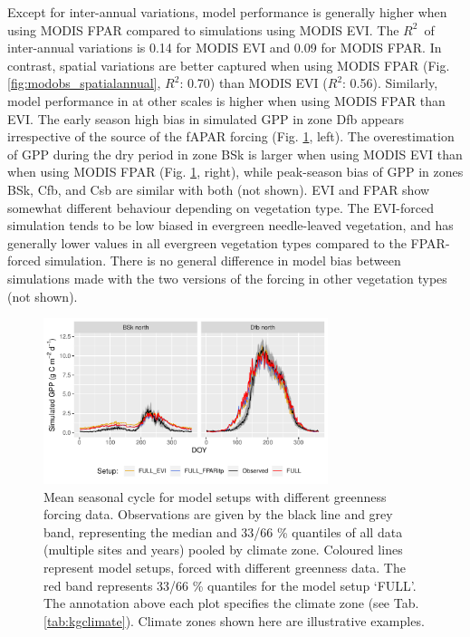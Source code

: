\documentclass[gmd, manuscript]{copernicus}
\newcommand{\rsq}{$R^2$}
\begin{document}
Except for inter-annual variations, model performance is generally higher when using MODIS FPAR compared to simulations using MODIS EVI. The \rsq\ of inter-annual variations is 0.14 for MODIS EVI and 0.09 for MODIS FPAR. In contrast, spatial variations are better captured when using MODIS FPAR (Fig. \ref{fig:modobs_spatialannual}, \rsq : 0.70) than MODIS EVI (\rsq : 0.56). Similarly, model performance in at other scales is higher when using MODIS FPAR than EVI. The early season high bias in simulated GPP in zone Dfb appears irrespective of the source of the fAPAR forcing (Fig. \ref{fig:season_greenness}, left). The overestimation of GPP during the dry period in zone BSk is larger when using MODIS EVI than when using MODIS FPAR (Fig. \ref{fig:season_greenness}, right), while peak-season bias of GPP in zones BSk, Cfb, and Csb are similar with both (not shown). EVI and FPAR show somewhat different behaviour depending on vegetation type. The EVI-forced simulation tends to be low biased in evergreen needle-leaved vegetation, and has generally lower values in all evergreen vegetation types compared to the FPAR-forced simulation. There is no general difference in model bias between simulations made with the two versions of the forcing in other vegetation types (not shown). 

 \begin{figure}[t]
    \centering
\includegraphics[width=8.3cm]{fig/meandoy_byzone_greenness.pdf}
    \caption{Mean seasonal cycle for model setups with different greenness forcing data. Observations are given by the black line and grey band, representing the median and 33/66 \% quantiles of all data (multiple sites and years) pooled by climate zone. Coloured lines represent model setups, forced with different greenness data. The red band represents 33/66 \% quantiles for the model setup `FULL'. The annotation above each plot specifies the climate zone (see Tab. \ref{tab:kgclimate}). Climate zones shown here are illustrative examples.}
    \label{fig:season_greenness}
\end{figure}
\end{document}
